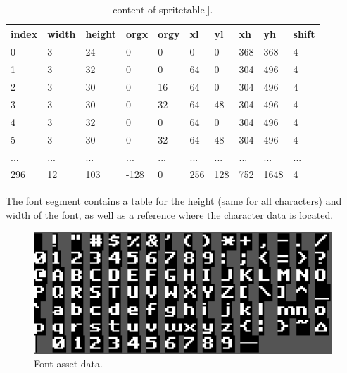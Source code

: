 \documentclass[book.tex]{subfiles}
\begin{document}
\begin{table}[H]
  \begin{tabularx}{\textwidth}[c]{lXXXXXXXXX}
  \hline
  \textbf{index} & \textbf{width} & \textbf{height} & \textbf{orgx} & \textbf{orgy}
    & \textbf{xl} & \textbf{yl} & \textbf{xh} & \textbf{yh} & \textbf{shift} \\ \hline
  0  &   3  &   24  &   0  &   0  &   0  &   0  &   368  &   368  &   4 \\
  1  &   3  &   32  &   0  &   0  &   64  &   0  &   304  &   496  &   4 \\
  2  &   3  &   30  &   0  &   16  &   64  &   0  &   304  &   496  &   4 \\
  3  &   3  &   30  &   0  &   32  &   64  &   48  &   304  &   496  &   4 \\
  4  &   3  &   32  &   0  &   0  &   64  &   0  &   304  &   496  &   4 \\
  5  &   3  &   30  &   0  &   32  &   64  &   48  &   304  &   496  &   4 \\
 ...  &   ...  &   ...  &   ...  &   ...  &   ...  &   ...  &   ...  &   ...  &   ... \\
 296  &   12  &   103  &   -128  &   0  &   256  &   128  &   752  &   1648  &   4\\
  \end{tabularx}
  \caption{content of spritetable[].}
  \label{table:spritetable}
  \end{table}

The font segment contains a table for the height (same for all characters) and width of the font, as well as a reference where the character data is located.\\
\par
\begin{minipage}{\textwidth}
 \par
 \end{minipage}
\begin{figure}[H] 
  \centering 
  \includegraphics[width=1.0\textwidth, frame]{screenshots_300dpi/font.png}
  \caption{Font asset data.}
  \label{fig:font_assets}
\end{figure} 
\end{document}
